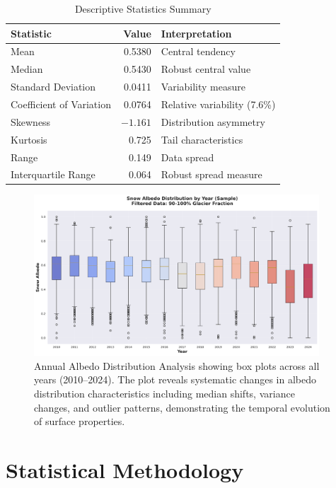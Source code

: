 \documentclass[12pt,a4paper]{article}
\begin{document}
\begin{table}[H]
\centering
\caption{Descriptive Statistics Summary}
\label{tab:descriptive_stats}
\begin{tabular}{@{}lrl@{}}
\toprule
\textbf{Statistic} & \textbf{Value} & \textbf{Interpretation} \\
\midrule
Mean & 0.5380 & Central tendency \\
Median & 0.5430 & Robust central value \\
Standard Deviation & 0.0411 & Variability measure \\
Coefficient of Variation & 0.0764 & Relative variability (7.6\%) \\
Skewness & $-1.161$ & Distribution asymmetry \\
Kurtosis & 0.725 & Tail characteristics \\
Range & 0.149 & Data spread \\
Interquartile Range & 0.064 & Robust spread measure \\
\bottomrule
\end{tabular}
\end{table}

\begin{figure}[H]
\centering
\includegraphics[width=0.95\textwidth]{../../results/plots/distribution_all_years.png}
\caption{Annual Albedo Distribution Analysis showing box plots across all years (2010--2024). The plot reveals systematic changes in albedo distribution characteristics including median shifts, variance changes, and outlier patterns, demonstrating the temporal evolution of surface properties.}
\label{fig:annual_distributions}
\end{figure}

\section{Statistical Methodology}
\end{document}
